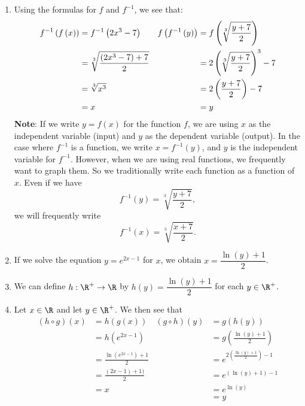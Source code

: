 \begin{enumerate}
\begin{enumerate}
\item Using the formulas for $f$ and $f^{-1}$, we see that:
\begin{align}
f^{ - 1} \left( {f\left( x \right)} \right) &= f^{ - 1} \left( {2x^3  - 7} \right)  & 
f\left( {f^{ - 1} \left( y \right)} \right) &= f\left( {\sqrt[3]{{\frac{{y + 7}}
{2}}}} \right) \notag\\
   &= \sqrt[3]{{\frac{{\left( {2x^3  - 7} \right) + 7}}{2}}} &
   &= 2\left( {\sqrt[3]{{\frac{{y + 7}}{2}}}} \right)^3  - 7 \notag \\
   &= \sqrt[3]{{x^3 }}  &     &= 2\left( {\frac{{y + 7}}{2}} \right) - 7 \notag \\
   &= x                 &     &= y \notag
\end{align}
\noindent
\textbf{Note}:  If we write  $y = f( x )$ for the function  $f$, we are using  $x$  as the independent variable (input) and  $y$  as the dependent variable (output).  In the case where  $f^{ - 1} $ is a function, we write  $x = f^{ - 1} ( y )$, and  $y$  is the independent variable for  $f^{ - 1} $.  However, when we are using real functions, we frequently want to graph them.  So we traditionally write each function as a function of  $x$.  Even if we have 
\[
f^{ - 1} ( y ) = \sqrt[3]{{\frac{{y + 7}}{2}}}, 
\]
we will frequently write 
\[
f^{ - 1} ( x ) = \sqrt[3]{{\frac{{x + 7}}{2}}}.
\]


\item If we solve the equation $y = e^{2x - 1}$ for $x$, we obtain $x = \dfrac{\ln(y) + 1}{2}$.

\item We can define $h: \R^+ \to \R$ by $h(y) = \dfrac{\ln(y) + 1}{2}$ for each $y \in \R^+$.

\item Let $x \in \R$ and let $y \in \R^+$.  We then see that
\begin{align*}
(h \circ g)(x) &= h \left( g(x) \right)  &  (g \circ h)(y) &= g \left( h(y) \right) \\
               &= h \left( e^{2x - 1} \right) &  &= g \left( \frac{\ln(y) + 1}{2} \right) \\
               &= \frac{\ln \left( e^{2x - 1} \right) + 1}{2} & &= e^{2 \left( \frac{\ln(y) + 1}{2} \right) - 1} \\
               &= \frac{(2x - 1) + 1)}{2} & &= e^{\left( \ln(y) + 1 \right) - 1} \\
               &= x   &  &= e^{\ln(y)} \\
               &      &  &= y
\end{align*}



\end{enumerate}
\end{enumerate}
